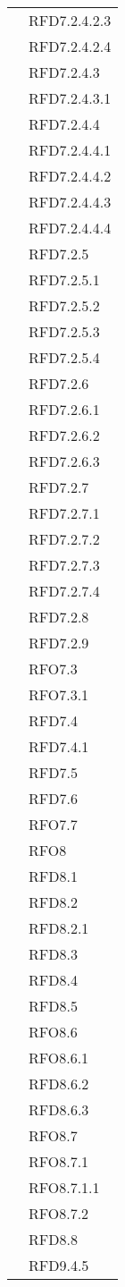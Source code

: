 \begin{longtable}{|>{\centering}m{10cm}|m{3cm}<{\centering}|}
& RFD7.2.4.2.3\\
& RFD7.2.4.2.4\\
& RFD7.2.4.3\\
& RFD7.2.4.3.1\\
& RFD7.2.4.4\\
& RFD7.2.4.4.1\\
& RFD7.2.4.4.2\\
& RFD7.2.4.4.3\\
& RFD7.2.4.4.4\\
& RFD7.2.5\\
& RFD7.2.5.1\\
& RFD7.2.5.2\\
& RFD7.2.5.3\\
& RFD7.2.5.4\\
& RFD7.2.6\\
& RFD7.2.6.1\\
& RFD7.2.6.2\\
& RFD7.2.6.3\\
& RFD7.2.7\\
& RFD7.2.7.1\\
& RFD7.2.7.2\\
& RFD7.2.7.3\\
& RFD7.2.7.4\\
& RFD7.2.8\\
& RFD7.2.9\\
& RFO7.3\\
& RFO7.3.1\\
& RFD7.4\\
& RFD7.4.1\\
& RFD7.5\\
& RFD7.6\\
& RFO7.7\\
& RFO8\\
& RFD8.1\\
& RFD8.2\\
& RFD8.2.1\\
& RFD8.3\\
& RFD8.4\\
& RFD8.5\\
& RFO8.6\\
& RFO8.6.1\\
& RFD8.6.2\\
& RFD8.6.3\\
& RFO8.7\\
& RFO8.7.1\\
& RFO8.7.1.1\\
& RFO8.7.2\\
& RFD8.8\\
& RFD9.4.5\\

\end{longtable}
